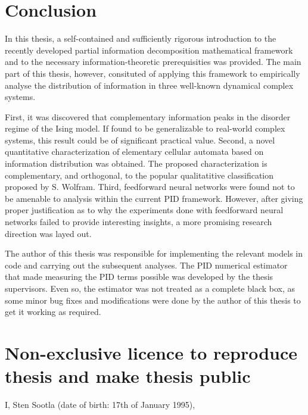 \documentclass[12pt]{article}
\begin{document}
\newpage
\section*{Conclusion}

In this thesis, a self-contained and sufficiently rigorous introduction to the recently developed partial information decomposition mathematical framework and to the necessary information-theoretic prerequisities was provided. The main part of this thesis, however, consituted of applying this framework to empirically analyse the distribution of information in three well-known dynamical complex systems. 

First, it was discovered that complementary information peaks in the disorder regime of the Ising model. If found to be generalizable to real-world complex systems, this result could be of significant practical value. Second, a novel quantitative characterization of elementary cellular automata based on information distribution was obtained. The proposed characterization is complementary, and orthogonal, to the popular qualitatitive classification proposed by S. Wolfram. Third, feedforward neural networks were found not to be amenable to analysis within the current PID framework. However, after giving proper justification as to why the experiments done with feedforward neural networks failed to provide interesting insights, a more promising research direction was layed out. 

The author of this thesis was responsible for implementing the relevant models in code and carrying out the subsequent analyses. 
The PID numerical estimator that made measuring the PID terms possible was developed by the thesis supervisors. Even so, the estimator was not treated as a complete black box, as some minor bug fixes and modifications were done by the author of this thesis to get it working as required. 


\newpage



\appendix
\pagebreak
\section*{\small Non-exclusive licence to reproduce thesis and make thesis public}

I, Sten Sootla (date of birth: 17th of January 1995),
\end{document}
